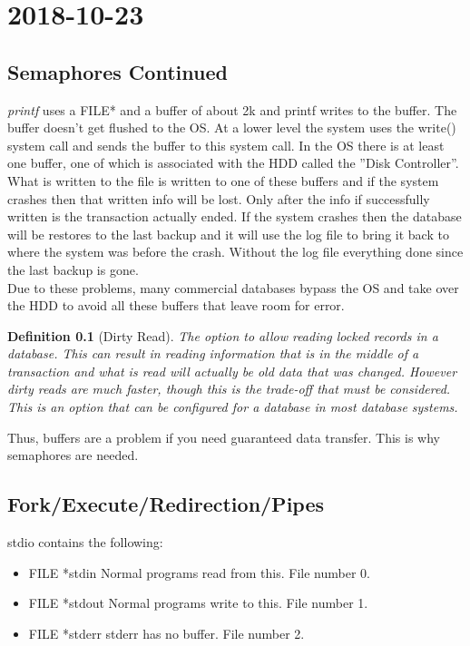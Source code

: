 \documentclass{report}
\newtheorem*{defn}{Definition}
\newcommand{\mychapter}[2]{
	\setcounter{chapter}{#1}
	\setcounter{section}{0}
	\chapter*{#2}
	\addcontentsline{toc}{chapter}{#2}
}
\begin{document}
\mychapter{5}{2018-10-23}
\section{Semaphores Continued}
\textit{printf} uses a FILE* and a buffer of about 2k and printf writes to the buffer. The buffer doesn't get flushed to the OS. At a lower level the system uses the write() system call and sends the buffer to this system call. In the OS there is at least one buffer, one of which is associated with the HDD called the ''Disk Controller''. What is written to the file is written to one of these buffers and if the system crashes then that written info will be lost. Only after the info if successfully written is the transaction actually ended. If the system crashes then the database will be restores to the last backup and it will use the log file to bring it back to where the system was before the crash. Without the log file everything done since the last backup is gone.\\

Due to these problems, many commercial databases bypass the OS and take over the HDD to avoid all these buffers that leave room for error.\\ 

\begin{defn}[Dirty Read]
The option to allow reading locked records in a database. This can result in reading information that is in the middle of a transaction and what is read will actually be old data that was changed. However dirty reads are much faster, though this is the trade-off that must be considered. This is an option that can be configured for a database in most database systems.
\end{defn}

Thus, buffers are a problem if you need guaranteed data transfer. This is why semaphores are needed.

\section{Fork/Execute/Redirection/Pipes}
stdio contains the following:
\begin{itemize}
\item FILE *stdin
	Normal programs read from this. File number 0.
\item FILE *stdout
	Normal programs write to this. File number 1.
\item FILE *stderr
	stderr has no buffer. File number 2.
\end{itemize}
\end{document}
